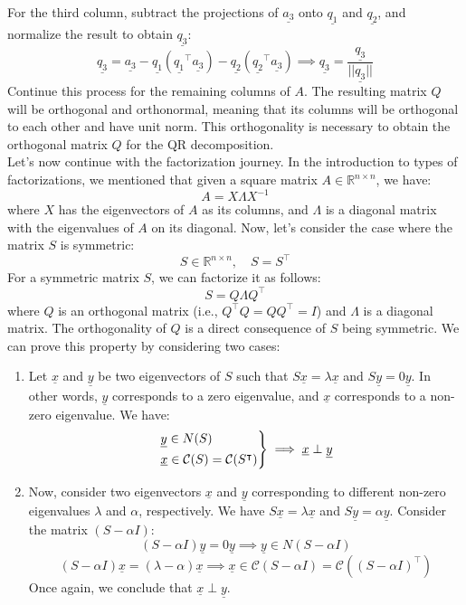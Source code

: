 For the third column, subtract the projections of $\underline{a_3}$ onto $\underline{q_1}$ and $\underline{q_2}$, and normalize the result to obtain $\underline{q_3}$:
\[
    \underline{q_3} = \underline{a_3} - \underline{q_1}(\underline{q_1}^\intercal \underline{a_3}) - \underline{q_2}(\underline{q_2}^\intercal \underline{a_3}) \implies \underline{q_3} = \dfrac{\underline{q_3}}{||\underline{q_3}||}
\]
Continue this process for the remaining columns of $A$. The resulting matrix $Q$ will be orthogonal and orthonormal, meaning that its columns will be orthogonal to each other and have unit norm. This orthogonality is necessary to obtain the orthogonal matrix $Q$ for the QR decomposition.\\
Let's now continue with the factorization journey. In the introduction to types of factorizations, we mentioned that given a square matrix $A \in \mathbb{R}^{n \times n}$, we have:
\[
    A = X \Lambda X^{-1}
\]
where $X$ has the eigenvectors of $A$ as its columns, and $\Lambda$ is a diagonal matrix with the eigenvalues of $A$ on its diagonal. Now, let's consider the case where the matrix $S$ is symmetric:
\[
    S \in \mathbb{R}^{n\times n}, \quad S = S^\intercal
\]
For a symmetric matrix $S$, we can factorize it as follows:
\[
    S = Q \Lambda Q^\intercal
\]
where $Q$ is an orthogonal matrix (i.e., $Q^\intercal Q = Q Q^\intercal = I$) and $\Lambda$ is a diagonal matrix. The orthogonality of $Q$ is a direct consequence of $S$ being symmetric. We can prove this property by considering two cases:

\begin{enumerate}
    \item Let $\underline{x}$ and $\underline{y}$ be two eigenvectors of $S$ such that $S\underline{x} = \lambda\underline{x}$ and $S\underline{y} = 0\underline{y}$. In other words, $\underline{y}$ corresponds to a zero eigenvalue, and $\underline{x}$ corresponds to a non-zero eigenvalue. We have:
    \[
        \begin{rcases}
            \underline{y} \in N(S) \\
            \underline{x} \in \mathcal{C}(S) = \mathcal{C}(S^{\intercal})    
        \end{rcases}
        \implies \underline{x} \perp \underline{y}
    \]

    
    \item Now, consider two eigenvectors $\underline{x}$ and $\underline{y}$ corresponding to different non-zero eigenvalues $\lambda$ and $\alpha$, respectively. We have $S\underline{x} = \lambda\underline{x}$ and $S\underline{y} = \alpha\underline{y}$. Consider the matrix $(S - \alpha I)$:
    \[
        (S - \alpha I)\underline{y} = 0\underline{y} \implies \underline{y} \in N(S - \alpha I)
    \]
    \[
        (S - \alpha I)\underline{x} = (\lambda - \alpha)\underline{x} \implies \underline{x} \in \mathcal{C}(S - \alpha I) = \mathcal{C}((S - \alpha I)^{\intercal})
    \]
    Once again, we conclude that $\underline{x} \perp \underline{y}$.
\end{enumerate}


